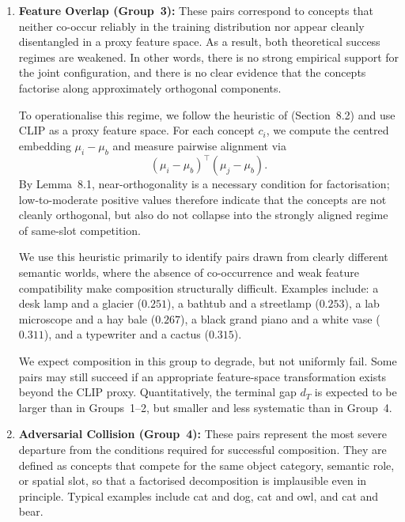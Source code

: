 \begin{enumerate}
    \item \textbf{Feature Overlap (Group~3):}
    These pairs correspond to concepts that neither co-occur reliably in the training distribution nor appear cleanly disentangled in a proxy feature space. 
    As a result, both theoretical success regimes are weakened. In other words, there is no strong empirical support for the joint configuration, and there is no clear evidence that the concepts factorise along approximately orthogonal components.

    To operationalise this regime, we follow the heuristic of \citet{mechanisms2025projective} (Section~8.2) and use CLIP as a proxy feature space. For each concept $c_i$, we compute the centred embedding $\mu_i - \mu_b$ and measure pairwise alignment via
    \[
    (\mu_i - \mu_b)^\top (\mu_j - \mu_b).
    \]
    By Lemma~8.1, near-orthogonality is a necessary condition for factorisation; low-to-moderate positive values therefore indicate that the concepts are not cleanly orthogonal, but also do not collapse into the strongly aligned regime of same-slot competition.

    We use this heuristic primarily to identify pairs drawn from clearly different semantic worlds, where the absence of co-occurrence and weak feature compatibility make composition structurally difficult. 
    Examples include: a desk lamp and a glacier ($0.251$), a bathtub and a streetlamp ($0.253$), a lab microscope and a hay bale ($0.267$), a black grand piano and a white vase ($0.311$), and a typewriter and a cactus ($0.315$).
   
    We expect composition in this group to degrade, but not uniformly fail. Some pairs may still succeed if an appropriate feature-space transformation exists beyond the CLIP proxy. 
    Quantitatively, the terminal gap $d_T$ is expected to be larger than in Groups~1--2, but smaller and less systematic than in Group~4.


    \item \textbf{Adversarial Collision (Group~4):}
    These pairs represent the most severe departure from the conditions required for successful composition.
    They are defined as concepts that compete for the same object category, semantic role, or spatial slot, so that a factorised decomposition is implausible even in principle. 
    Typical examples include cat and dog, cat and owl, and cat and bear.


\end{enumerate}
